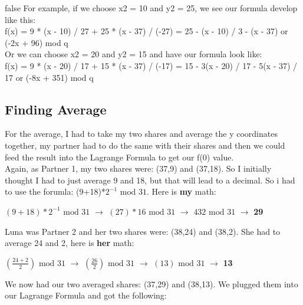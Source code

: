 \documentclass[10pt]{article}
\begin{document}
\if false
For example, if we choose x2 = 10 and y2 = 25, we see our formula develop like this: \\
f(x) = 9 * (x - 10) / 27 + 25 * (x - 37) / (-27) = 25 - (x - 10) / 3 - (x - 37) or (-2x + 96) mod q\\
\newline
Or we can choose x2 = 20 and y2 = 15 and have our formula look like: \\
f(x) = 9 * (x - 20) / 17 + 15 * (x - 37) / (-17) = 15 - 3(x - 20) / 17 - 5(x - 37) / 17 or (-8x + 351) mod q\\
\fi

\vspace{0.2in}
\subsection{Finding Average}
\noindent For the average, I had to take my two shares and average the y coordinates together, my partner had to do the same with their shares and then we could feed the result into the Lagrange Formula to get our f(0) value.\\
Again, as Partner 1, my two shares were: (37,9) and (37,18). 
So I initially thought I had to just average 9 and 18, but that will lead to a decimal. So i had to use the forumla: (9+18)*$2^{-1} \textrm{ mod } 31$.  Here is \textbf{my} math:\\ \vspace{0.1in}

$\left(9+18\right)*2^{-1} \textrm{ mod } 31$ $\rightarrow$
$\left(27\right)*16 \textrm{ mod } 31$ $\rightarrow$
$432 \textrm{ mod } 31$ $\rightarrow$ \textbf{29}\\
\newline

\noindent Luna was Partner 2 and her two shares were: (38,24) and (38,2). 
She had to average 24 and 2, here is \textbf{her} math:\\ \vspace{0.1in}

$\left(\frac{24+2}{2}\right) \textrm{ mod } 31$ $\rightarrow$
$\left(\frac{26}{2}\right) \textrm{ mod } 31$ $\rightarrow$ 
$\left(13\right) \textrm{ mod } 31$ $\rightarrow$ \textbf{13}\\
\newline

\noindent We now had our two averaged shares: (37,29) and (38,13). We plugged them into our Lagrange Formula and got the following:\\ \vspace{0.1in}
\end{document}
